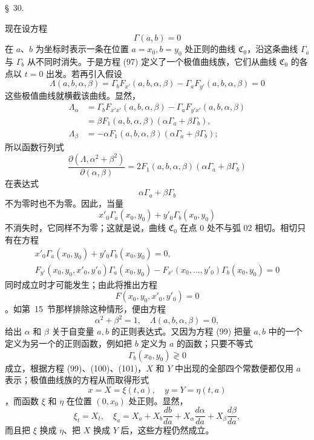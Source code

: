 \documentclass[11pt,a4paper,leqno]{article}
\begin{document}
\begin{center}{\large \S~30.}\end{center}

现在设方程
\begin{equation}\tag{99}
\Gamma(a,b)=0
\end{equation}
在 $a$、$b$ 为坐标时表示一条在位置 $a=x_0,b=y_0$ 处正则的曲线 $\mathfrak C_0$，沿这条曲线 $\Gamma_a$ 与 $\Gamma_b$ 从不同时消失。于是方程 (97) 定义了一个极值曲线族，它们从曲线 $\mathfrak C_0$ 的各点以 $t=0$ 出发。若再引入假设
\begin{equation}\tag{100}
\Lambda(a,b,\alpha,\beta)=\Gamma_bF_{x'}(a,b,\alpha,\beta)-\Gamma_aF_{y'}(a,b,\alpha,\beta)=0
\end{equation}
这些极值曲线就横截该曲线。显然，
\[
\begin{aligned}
\Lambda_{\alpha}
&=\Gamma_bF_{x'x'}(a,b,\alpha,\beta)-\Gamma_aF_{y'x'}(a,b,\alpha,\beta)\\
&=\beta F_1(a,b,\alpha,\beta)(\alpha\Gamma_a+
\beta\Gamma_b),\\
\Lambda_{\beta}
&=-\alpha F_1(a,b,\alpha,\beta)(\alpha\Gamma_a+
\beta\Gamma_b);
\end{aligned}
\]
所以函数行列式
\[
\frac{\partial(\Lambda,\alpha^2+\beta^2)}{\partial(\alpha,\beta)}
=2F_1(a,b,\alpha,\beta)(\alpha\Gamma_a+
\beta\Gamma_b)
\]
在表达式
\[
\alpha\Gamma_a+\beta\Gamma_b
\]
不为零时也不为零。因此，当量
\[
x'_0\Gamma_a(x_0,y_0)+y'_0\Gamma_b(x_0,y_0)
\]
不消失时，它同样不为零；这就是说，曲线 $\mathfrak C_0$ 在点 0 处不与弧 02 相切。相切只有在方程
\[
\begin{gathered}
x'_0\Gamma_a(x_0,y_0)+y'_0\Gamma_b(x_0,y_0)=0,\\
F_{y'}(x_0,y_0,x'_0,y'_0)\Gamma_a(x_0,y_0)
-F_{x'}(x_0,\ldots,y'_0)\Gamma_b(x_0,y_0)=0
\end{gathered}
\]
同时成立时才可能发生；由此将推出方程
\[
F(x_0,y_0,x'_0,y'_0)=0
\]
。如第~15~节那样排除这种情形，便由方程
\begin{equation}\tag{101}
\alpha^2+\beta^2=1,
\quad
\Lambda(a,b,\alpha,\beta)=0,
\end{equation}
给出 $\alpha$ 和 $\beta$ 关于自变量 $a,b$ 的正则表达式。又因为方程 (99) 把量 $a,b$ 中的一个定义为另一个的正则函数，例如把 $b$ 定义为 $a$ 的函数；只要不等式
\[
\Gamma_b(x_0,y_0)\gtrless0
\]
成立，根据方程 (99)、(100)、(101)，$X$ 和 $Y$ 中出现的全部四个常数便都仅用 $a$ 表示；极值曲线族的方程从而取得形式
\[
x=X=\xi(t,a),
\quad
y=Y=\eta(t,a)
\]
，而函数 $\xi$ 和 $\eta$ 在位置 $(0,x_0)$ 处正则。显然，
\[
\xi_t=X_t,
\quad
\xi_a=X_a+X_b\frac{db}{da}+X_{\alpha}\frac{d\alpha}{da}+X_{\beta}\frac{d\beta}{da},
\]
而且把 $\xi$ 换成 $\eta$、把 $X$ 换成 $Y$ 后，这些方程仍然成立。
\end{document}
